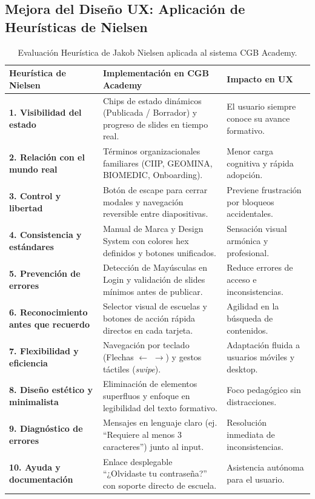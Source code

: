 \documentclass[11pt,a4paper]{article}
\begin{document}
\subsection{Mejora del Diseño UX: Aplicación de Heurísticas de Nielsen}
\begin{table}[H]
    \centering
    \small
    \begin{tabularx}{\textwidth}{l X X}
        \toprule
        \textbf{Heurística de Nielsen} & \textbf{Implementación en CGB Academy} & \textbf{Impacto en UX} \\
        \midrule
        \textbf{1. Visibilidad del estado} & Chips de estado dinámicos (Publicada / Borrador) y progreso de slides en tiempo real. & El usuario siempre conoce su avance formativo. \\
        \textbf{2. Relación con el mundo real} & Términos organizacionales familiares (CIIP, GEOMINA, BIOMEDIC, Onboarding). & Menor carga cognitiva y rápida adopción. \\
        \textbf{3. Control y libertad} & Botón de escape para cerrar modales y navegación reversible entre diapositivas. & Previene frustración por bloqueos accidentales. \\
        \textbf{4. Consistencia y estándares} & Manual de Marca y Design System con colores hex definidos y botones unificados. & Sensación visual armónica y profesional. \\
        \textbf{5. Prevención de errores} & Detección de Mayúsculas en Login y validación de slides mínimos antes de publicar. & Reduce errores de acceso e inconsistencias. \\
        \textbf{6. Reconocimiento antes que recuerdo} & Selector visual de escuelas y botones de acción rápida directos en cada tarjeta. & Agilidad en la búsqueda de contenidos. \\
        \textbf{7. Flexibilidad y eficiencia} & Navegación por teclado (Flechas $\leftarrow$ $\rightarrow$) y gestos táctiles (\textit{swipe}). & Adaptación fluida a usuarios móviles y desktop. \\
        \textbf{8. Diseño estético y minimalista} & Eliminación de elementos superfluos y enfoque en legibilidad del texto formativo. & Foco pedagógico sin distracciones. \\
        \textbf{9. Diagnóstico de errores} & Mensajes en lenguaje claro (ej. ``Requiere al menos 3 caracteres'') junto al input. & Resolución inmediata de inconsistencias. \\
        \textbf{10. Ayuda y documentación} & Enlace desplegable ``¿Olvidaste tu contraseña?'' con soporte directo de escuela. & Asistencia autónoma para el usuario. \\
        \bottomrule
    \end{tabularx}
    \caption{Evaluación Heurística de Jakob Nielsen aplicada al sistema CGB Academy.}
    \label{tab:nielsen}
\end{table}
\end{document}
